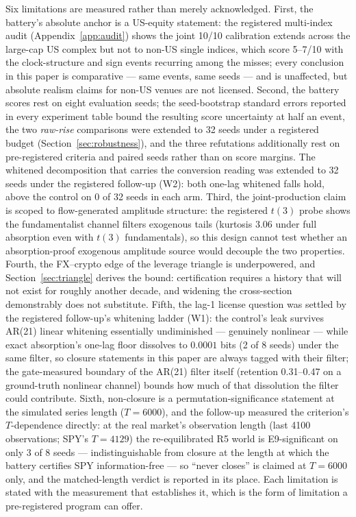 \documentclass[11pt]{article}
\begin{document}
Six limitations are measured rather than merely acknowledged. First, the
battery's absolute anchor is a US-equity statement: the registered
multi-index audit (Appendix~\ref{app:audit}) shows the joint 10/10
calibration extends across the large-cap US complex but not to non-US single
indices, which score 5--7/10 with the clock-structure and sign events
recurring among the misses; every conclusion in this paper is comparative
--- same events, same seeds --- and is unaffected, but absolute realism
claims for non-US venues are not licensed. Second, the battery scores rest
on eight evaluation seeds; the seed-bootstrap standard errors reported in
every experiment table bound the resulting score uncertainty at half an
event, the two \emph{raw-rise} comparisons were extended
to 32 seeds under a registered budget (Section~\ref{sec:robustness}), and
the three refutations additionally rest on pre-registered criteria and
paired seeds rather than on score margins. The whitened decomposition
that carries the conversion reading was extended to 32 seeds under the
registered follow-up (W2): both one-lag whitened falls hold, above the
control on 0 of 32 seeds in each arm. Third, the joint-production
claim is scoped to flow-generated amplitude structure: the registered
$t(3)$ probe shows the fundamentalist channel filters exogenous tails
(kurtosis $3.06$ under full absorption even with $t(3)$ fundamentals), so
this design cannot test whether an absorption-proof exogenous amplitude
source would decouple the two properties. Fourth, the
FX--crypto edge of the leverage triangle is underpowered, and
Section~\ref{sec:triangle} derives the bound: certification requires a
history that will not exist for roughly another decade, and widening the
cross-section demonstrably does not substitute. Fifth, the lag-1
license question was settled by the registered follow-up's whitening
ladder (W1): the control's leak survives AR(21) linear whitening
essentially undiminished --- genuinely nonlinear --- while exact
absorption's one-lag floor dissolves to $0.0001$ bits (2 of 8 seeds)
under the same filter, so closure statements in this paper are always
tagged with their filter; the gate-measured boundary of the AR(21)
filter itself (retention 0.31--0.47 on a ground-truth nonlinear channel)
bounds how much of that dissolution the filter could contribute. Sixth,
non-closure is a permutation-significance statement
at the simulated series length ($T = 6000$), and the follow-up measured
the criterion's $T$-dependence directly: at the real market's
observation length (last 4100 observations; SPY's $T = 4129$) the
re-equilibrated R5 world is E9-significant on only 3 of 8 seeds ---
indistinguishable from closure at the length at which the battery
certifies SPY information-free --- so ``never closes'' is claimed at
$T = 6000$ only, and the matched-length verdict is reported in its
place. Each limitation is stated
with the measurement that establishes it, which is the form of limitation a
pre-registered program can offer.
\end{document}
